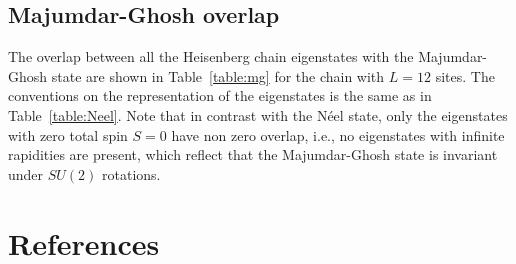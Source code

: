 \documentclass[11pt]{iopart}
\begin{document}
\subsection{Majumdar-Ghosh overlap}
\label{app-mg}

The overlap between all the Heisenberg chain eigenstates with the Majumdar-Ghosh state are shown in 
Table~\ref{table:mg} for the chain with $L=12$ sites. The conventions on the representation of 
the eigenstates is the same as in Table~\ref{table:Neel}. Note that in contrast with the N\'eel 
state, only the eigenstates with zero total spin $S=0$ have non zero overlap, i.e., no eigenstates 
with infinite rapidities are present, which reflect that the Majumdar-Ghosh state is invariant 
under $SU(2)$ rotations. 


\section*{References}
\end{document}
